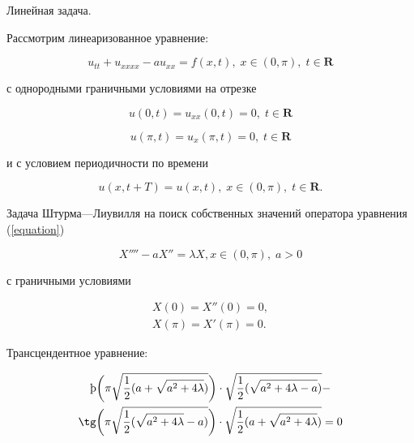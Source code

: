 \documentclass[ignorenonframetext,unicode,handout, 9pt]{beamer}
\numberwithin{equation}{section}
\begin{document}
\begin{frame}{Линейная задача.}

Рассмотрим линеаризованное уравнение:

\begin{equation}\label{equation}
  u_{tt} + u_{xxxx} - au_{xx} =  f(x,t), \; x \in (0,\pi), \; t \in \textbf{R}
\end{equation}

с однородными граничными условиями на отрезке

\begin{equation}\label{ic1}
  u(0,t) = u_{xx}(0,t) = 0, \; t \in \textbf{R}
  \end{equation}

\begin{equation}\label{ic2}
  u(\pi,t) = u_{x}(\pi,t) = 0, \; t \in \textbf{R}
\end{equation}

и с условием периодичности по времени

\begin{equation}\label{period}
 u(x,t + T) = u(x,t), \; x \in (0,\pi) , \; t \in \textbf{R}.
\end{equation}

\end{frame}


\begin{frame}

Задача Штурма---Лиувилля на поиск собственных  значений оператора уравнения (\ref{equation})

\begin{equation}\label{task}
  X'''' - a X'' = \lambda X, x \in (0,\pi),\; a > 0
\end{equation}

с граничными условиями

\begin{gather*}
  X(0) = X''(0) =0  \label{bc1}, \\
  X(\pi) = X'(\pi) = 0 \label{bc2}.
\end{gather*}

Трансцендентное уравнение:

\begin{multline}\label{313}
\th\bigg(\pi \sqrt{\frac{1}{2}(a+\sqrt{a^{2}+4\lambda})}\bigg) \cdot \sqrt{\frac{1}{2}(\sqrt{a^{2}+4\lambda-a})} - \\
\tg\bigg(\pi \sqrt{\frac{1}{2}(\sqrt{a^{2}+4\lambda}-a)}\bigg) \cdot \sqrt{\frac{1}{2}(a+\sqrt{a^{2}+4\lambda})} = 0
\end{multline}

\end{frame}
\end{document}
